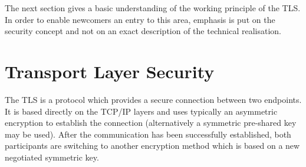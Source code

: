 The next section gives a basic understanding of the working principle of the TLS. In order to enable newcomers an entry to  this area, emphasis is put on the security concept and not on an exact description of the technical realisation.




\section{Transport Layer Security}


The TLS is a protocol which provides a secure connection between two endpoints.
It is based directly on the TCP/IP layers and uses typically an asymmetric encryption to establish the connection (alternatively a symmetric pre-shared key may be used).
After the communication has been successfully established, both participants are switching to another encryption method which is based on a new negotiated symmetric key.\\
%
%


